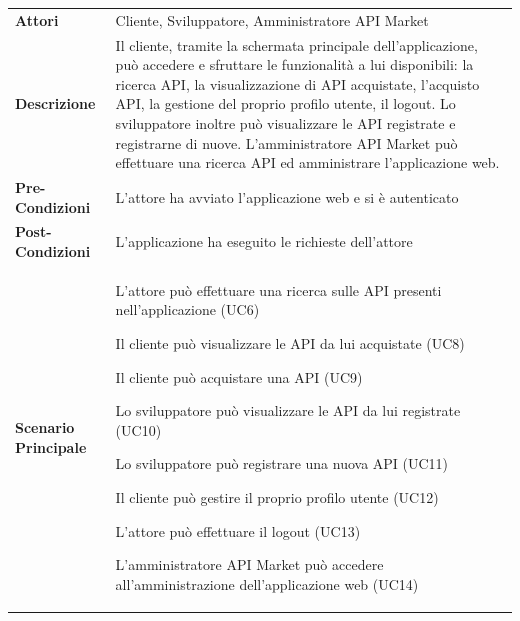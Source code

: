 \begin{longtable}{ l | p{11cm}}
	\hline
	\rowcolor{Gray}
	 \multicolumn{2}{c}{UC2 - Main post-autenticazione} \\
	 \hline
	\textbf{Attori} & Cliente, Sviluppatore, Amministratore API Market \\
	\textbf{Descrizione} & Il cliente, tramite la schermata principale dell'applicazione, può accedere e sfruttare le funzionalità a lui disponibili: la ricerca API, la visualizzazione di API acquistate, l'acquisto API, la gestione del proprio profilo utente, il logout.
	Lo sviluppatore inoltre può visualizzare le API registrate e registrarne di nuove.
	L'amministratore API Market può effettuare una ricerca API ed amministrare l'applicazione web. \\
	\textbf{Pre-Condizioni} & L'attore ha avviato l'applicazione web e si è autenticato \\
	\textbf{Post-Condizioni} & L'applicazione ha eseguito le richieste dell'attore \\
	\textbf{Scenario Principale} & 
	\begin{enumerate*}[label=(\arabic*.),itemjoin={\newline}]
		\item L'attore può effettuare una ricerca sulle API presenti nell'applicazione
(UC6)
		\item Il cliente può visualizzare le API da lui acquistate (UC8)
		\item Il cliente può acquistare una API (UC9)
		\item Lo sviluppatore può visualizzare le API da lui registrate (UC10)
		\item Lo sviluppatore può registrare una nuova API (UC11)
		\item Il cliente può gestire il proprio profilo utente (UC12)
		\item L'attore può effettuare il logout (UC13)
		\item L'amministratore API Market può accedere all'amministrazione dell'applicazione web (UC14)
	\end{enumerate*}\\
\end{longtable}